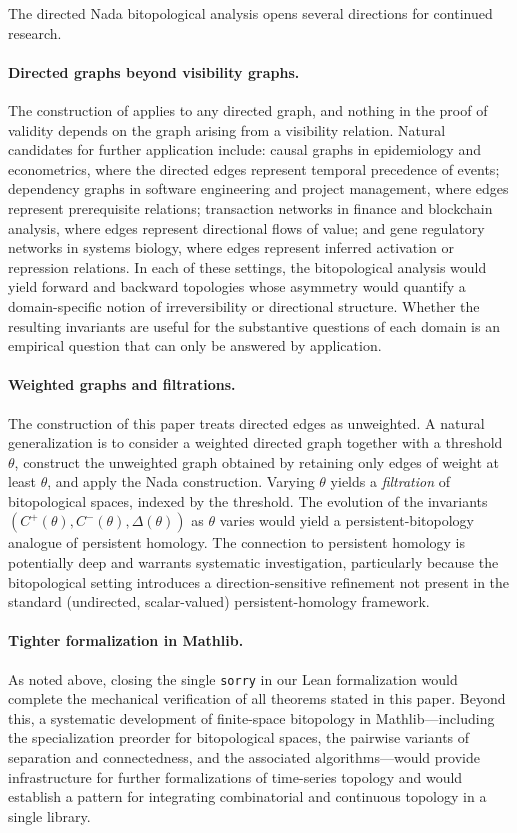 \documentclass[11pt,a4paper]{article}
\theoremstyle{plain}
\theoremstyle{definition}
\begin{document}
The directed Nada bitopological analysis opens several directions for
continued research.

\paragraph{Directed graphs beyond visibility graphs.}
The construction of  applies to any directed
graph, and nothing in the proof of validity depends on the graph
arising from a visibility relation. Natural candidates for further
application include: causal graphs in epidemiology and econometrics,
where the directed edges represent temporal precedence of events;
dependency graphs in software engineering and project management,
where edges represent prerequisite relations; transaction networks in
finance and blockchain analysis, where edges represent directional
flows of value; and gene regulatory networks in systems biology, where
edges represent inferred activation or repression relations. In each
of these settings, the bitopological analysis would yield forward and
backward topologies whose asymmetry would quantify a domain-specific
notion of irreversibility or directional structure. Whether the
resulting invariants are useful for the substantive questions of each
domain is an empirical question that can only be answered by
application.

\paragraph{Weighted graphs and filtrations.}
The construction of this paper treats directed edges as unweighted.
A natural generalization is to consider a weighted directed graph
together with a threshold $\theta$, construct the unweighted graph
obtained by retaining only edges of weight at least $\theta$, and
apply the Nada construction. Varying $\theta$ yields a
\emph{filtration} of bitopological spaces, indexed by the threshold.
The evolution of the invariants
$(C^{+}(\theta), C^{-}(\theta), \Delta(\theta))$ as $\theta$ varies
would yield a persistent-bitopology analogue of persistent homology.
The connection to persistent homology is potentially deep and warrants
systematic investigation, particularly because the bitopological
setting introduces a direction-sensitive refinement not present in the
standard (undirected, scalar-valued) persistent-homology framework.

\paragraph{Tighter formalization in Mathlib.}
As noted above, closing the single \texttt{sorry} in our Lean
formalization would complete the mechanical verification of all
theorems stated in this paper. Beyond this, a systematic development
of finite-space bitopology in Mathlib---including the specialization
preorder for bitopological spaces, the pairwise variants of separation
and connectedness, and the associated algorithms---would provide
infrastructure for further formalizations of time-series topology and
would establish a pattern for integrating combinatorial and continuous
topology in a single library.
\end{document}
